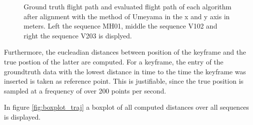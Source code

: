 	\begin{figure}%
    \centering
    \qquad
	\qquad
    \caption{
	Ground truth flight path and evaluated flight path of each algorithm after alignment with the method of Umeyama in the x and y axis in meters. 
	Left the sequence MH01, middle the sequence V102 and right the sequence V203 is displyed.
	}%
    \label{fig:flight_path}%
	\end{figure}
	
	
	Furthermore, the eucleadian distances between position of the keyframe and the true postion of the latter are computed. For a keyframe, 
	the entry of the groundtruth data with the lowest distance in time to the time the keyframe was inserted is taken as reference point. 
	This is justifiable, since the true position is sampled at a frequency of over 200 points per second. 
	
	In figure \ref{fig:boxplot_traj} a boxplot of all computed distances over all sequences is displayed. 
	
	
	
	
